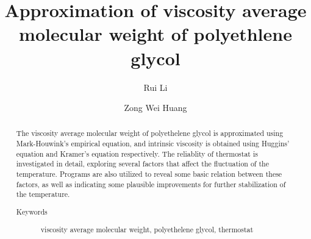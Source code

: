 \documentclass[%
 reprint,
 amsmath,amssymb,
 aps,
]{revtex4-1}
\begin{document}

\title{Approximation of viscosity average molecular weight of polyethlene glycol}%

\author{Rui Li}
%


\author{Zong Wei Huang}
%



\begin{abstract}
The viscosity average molecular weight of polyethelene glycol is approximated using Mark-Houwink's empirical equation, and intrinsic viscosity is obtained using Huggins' equation and Kramer's equation respectively. The reliablity of thermostat is investigated in detail, exploring several factors that affect the fluctuation of the temperature. Programs are also utilized to reveal some basic relation between these factors, as well as indicating some plausible improvements for further stabilization of the temperature.
\begin{description}
\item[Keywords]
viscosity average molecular weight, polyethelene glycol, thermostat
\end{description}
\end{abstract}

\maketitle
\end{document}

